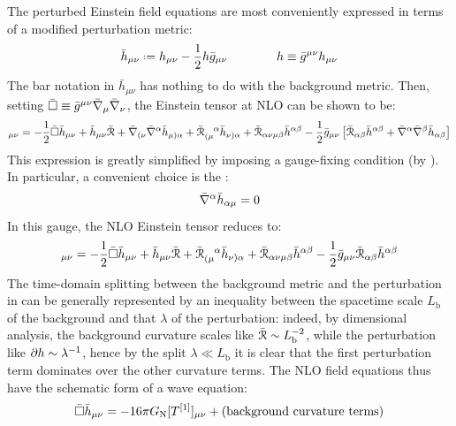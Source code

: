 The perturbed Einstein field equations  are most conveniently expressed in terms of a modified perturbation metric:
\begin{equation}
  \bar{h}_{\mu \nu} \defeq h_{\mu \nu} - \frac{1}{2} h \bar{g}_{\mu \nu}
  \qquad \qquad
  h \equiv \bar{g}^{\mu \nu} h_{\mu \nu}
\end{equation}
The bar notation in $ \bar{h}_{\mu \nu} $ has nothing to do with the background metric. Then, setting $ \bar{\Box} \equiv \bar{g}^{\mu \nu} \bar{\nabla}_\mu \bar{\nabla}_\nu $, the Einstein tensor at NLO can be shown to be:
\begin{equation}
  [G\od1]_{\mu \nu} = - \frac{1}{2} \bar{\Box} \bar{h}_{\mu \nu} + \bar{h}_{\mu \nu} \bar{\rr} + \bar{\na}_{(\nu} \bar{\na}^\alpha \bar{h}_{\mu)\alpha} + \tensor{\bar{\rr}}{_{(\mu}^\alpha} \bar{h}_{\nu)\alpha} + \bar{\rr}_{\alpha \nu \mu \beta} \bar{h}^{\alpha \beta} - \frac{1}{2} \bar{g}_{\mu \nu} \left[ \bar{\rr}_{\alpha \beta} \bar{h}^{\alpha \beta} + \bar{\na}^\alpha \bar{\na}^\beta \bar{h}_{\alpha \beta} \right]
  \label{eq:nlo-einstein}
\end{equation}
This expression is greatly simplified by imposing a gauge-fixing condition (by ). In particular, a convenient choice is the :
\begin{equation}
  \bar{\nabla}^\alpha \bar{h}_{\alpha \mu } = 0
  \label{eq:lorentz-gauge}
\end{equation}
In this gauge, the NLO Einstein tensor reduces to:
\begin{equation*}
  [G\od1]_{\mu \nu} = - \frac{1}{2} \bar{\Box} \bar{h}_{\mu \nu} + \bar{h}_{\mu \nu} \bar{\rr} + \tensor{\bar{\rr}}{_{(\mu}^\alpha} \bar{h}_{\nu)\alpha} + \bar{\rr}_{\alpha \nu \mu \beta} \bar{h}^{\alpha \beta} - \frac{1}{2} \bar{g}_{\mu \nu} \bar{\rr}_{\alpha \beta} \bar{h}^{\alpha \beta}
\end{equation*}
The time-domain splitting between the background metric and the perturbation in  can be generally represented by an inequality between the spacetime scale $ L_\text{b} $ of the background and that $ \lambda $ of the perturbation: indeed, by dimensional analysis, the background curvature scales like $ \bar{\EuScript{R}} \sim L_\text{b}^{-2} $, while the perturbation like $ \partial h \sim \lambda^{-1} $, hence by the split $ \lambda \ll L_\text{b} $ it is clear that the first perturbation term dominates over the other curvature terms. The NLO field equations thus have the schematic form of a wave equation:
\begin{equation*}
  \bar{\Box} \bar{h}_{\mu \nu} = - 16 \pi G_\text{N} [T^{[1]}]_{\mu \nu} + (\text{background curvature terms})
\end{equation*}

